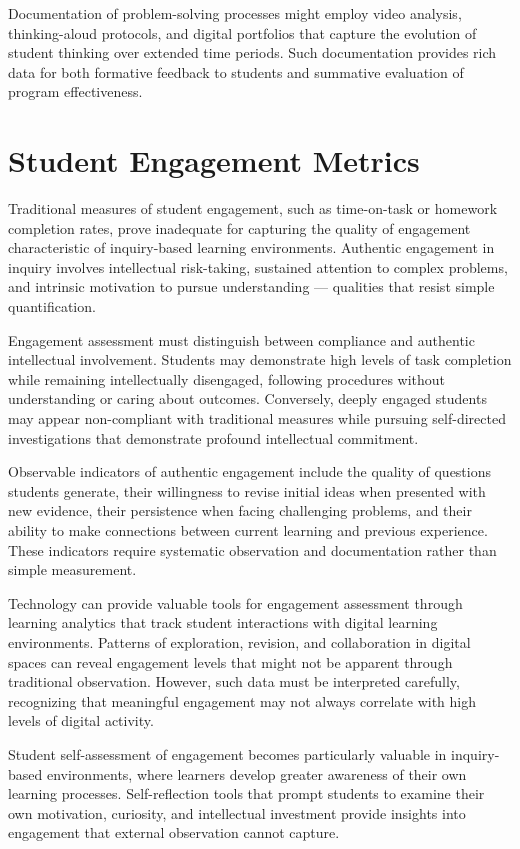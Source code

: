 \documentclass[
  Letterpaper,
]{scrbook}
\begin{document}
Documentation of problem-solving processes might employ video analysis,
thinking-aloud protocols, and digital portfolios that capture the
evolution of student thinking over extended time periods. Such
documentation provides rich data for both formative feedback to students
and summative evaluation of program effectiveness.

\section{Student Engagement Metrics}\label{student-engagement-metrics}

Traditional measures of student engagement, such as time-on-task or
homework completion rates, prove inadequate for capturing the quality of
engagement characteristic of inquiry-based learning environments.
Authentic engagement in inquiry involves intellectual risk-taking,
sustained attention to complex problems, and intrinsic motivation to
pursue understanding --- qualities that resist simple quantification.

Engagement assessment must distinguish between compliance and authentic
intellectual involvement. Students may demonstrate high levels of task
completion while remaining intellectually disengaged, following
procedures without understanding or caring about outcomes. Conversely,
deeply engaged students may appear non-compliant with traditional
measures while pursuing self-directed investigations that demonstrate
profound intellectual commitment.

Observable indicators of authentic engagement include the quality of
questions students generate, their willingness to revise initial ideas
when presented with new evidence, their persistence when facing
challenging problems, and their ability to make connections between
current learning and previous experience. These indicators require
systematic observation and documentation rather than simple measurement.

Technology can provide valuable tools for engagement assessment through
learning analytics that track student interactions with digital learning
environments. Patterns of exploration, revision, and collaboration in
digital spaces can reveal engagement levels that might not be apparent
through traditional observation. However, such data must be interpreted
carefully, recognizing that meaningful engagement may not always
correlate with high levels of digital activity.

Student self-assessment of engagement becomes particularly valuable in
inquiry-based environments, where learners develop greater awareness of
their own learning processes. Self-reflection tools that prompt students
to examine their own motivation, curiosity, and intellectual investment
provide insights into engagement that external observation cannot
capture.
\end{document}

